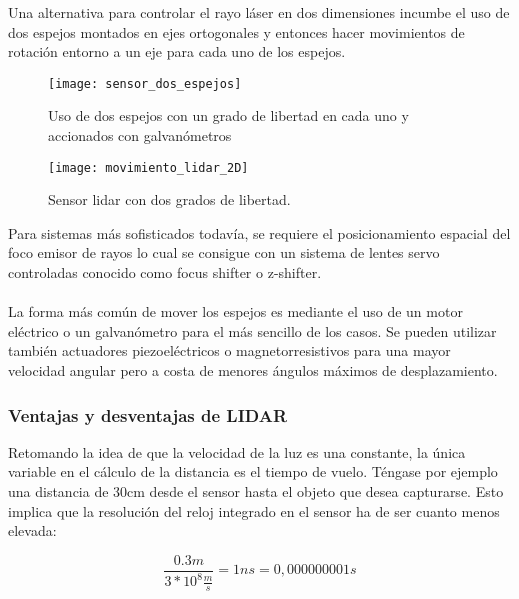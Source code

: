 Una alternativa para controlar el rayo láser en dos dimensiones incumbe el uso de dos espejos montados en ejes ortogonales y entonces hacer movimientos de rotación entorno a un eje para cada uno de los espejos.

\begin{figure}
  \texttt{[image: sensor\_dos\_espejos]}
  \caption{Uso de dos espejos con un grado de libertad en cada uno y accionados con galvanómetros}\label{fig:sensor dos espejos}
\endminipage\hfill
{}
  \texttt{[image: movimiento\_lidar\_2D]}
  \caption{Sensor lidar con dos grados de libertad.}\label{fig:movimiento lidar 2D}
\endminipage\hfill

\end{figure}

Para sistemas más sofisticados todavía, se requiere el posicionamiento espacial del foco emisor de rayos lo cual se consigue con un sistema de lentes servo controladas conocido como focus shifter o z-shifter.
\\
\\
La forma más común de mover los espejos es mediante el uso de un motor eléctrico o un galvanómetro para el más sencillo de los casos. Se pueden utilizar también actuadores piezoeléctricos o magnetorresistivos para una mayor velocidad angular pero a costa de menores ángulos máximos de desplazamiento.

\iffalse
\subsubsection{Ventajas y desventajas de LIDAR}

Retomando la idea de que la velocidad de la luz es una constante, la única variable en el cálculo de la distancia es el tiempo de vuelo. Téngase por ejemplo una distancia de 30cm desde el sensor hasta el objeto que desea capturarse. Esto implica que la resolución del reloj integrado en el sensor ha de ser cuanto menos elevada:

\begin{equation}
\frac{0.3m}{3*10^{8}\frac{m}{s}} = 1ns =0,000000001s
\end{equation}

